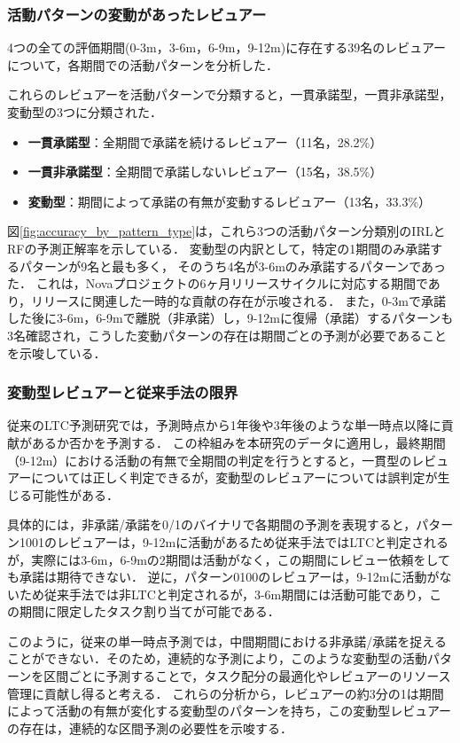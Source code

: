 \documentclass[11pt]{jreport}
\begin{document}
\subsubsection{活動パターンの変動があったレビュアー}
4つの全ての評価期間(0-3m，3-6m，6-9m，9-12m)に存在する39名のレビュアーについて，各期間での活動パターンを分析した．

これらのレビュアーを活動パターンで分類すると，一貫承諾型，一貫非承諾型，変動型の3つに分類された．
\begin{itemize}
    \item \textbf{一貫承諾型}：全期間で承諾を続けるレビュアー（11名，28.2\%）
    \item \textbf{一貫非承諾型}：全期間で承諾しないレビュアー（15名，38.5\%）
    \item \textbf{変動型}：期間によって承諾の有無が変動するレビュアー（13名，33.3\%）
\end{itemize}

図\ref{fig:accuracy_by_pattern_type}は，これら3つの活動パターン分類別のIRLとRFの予測正解率を示している．
変動型の内訳として，特定の1期間のみ承諾するパターンが9名と最も多く，
そのうち4名が3-6mのみ承諾するパターンであった．
これは，Novaプロジェクトの6ヶ月リリースサイクルに対応する期間であり，リリースに関連した一時的な貢献の存在が示唆される．
また，0-3mで承諾した後に3-6m，6-9mで離脱（非承諾）し，9-12mに復帰（承諾）するパターンも3名確認され，こうした変動パターンの存在は期間ごとの予測が必要であることを示唆している．

\subsubsection{変動型レビュアーと従来手法の限界}
従来のLTC予測研究では，予測時点から1年後や3年後のような単一時点以降に貢献があるか否かを予測する．
この枠組みを本研究のデータに適用し，最終期間（9-12m）における活動の有無で全期間の判定を行うとすると，一貫型のレビュアーについては正しく判定できるが，変動型のレビュアーについては誤判定が生じる可能性がある．

具体的には，非承諾/承諾を0/1のバイナリで各期間の予測を表現すると，パターン1001のレビュアーは，9-12mに活動があるため従来手法ではLTCと判定されるが，実際には3-6m，6-9mの2期間は活動がなく，この期間にレビュー依頼をしても承諾は期待できない．
逆に，パターン0100のレビュアーは，9-12mに活動がないため従来手法では非LTCと判定されるが，3-6m期間には活動可能であり，この期間に限定したタスク割り当てが可能である．

このように，従来の単一時点予測では，中間期間における非承諾/承諾を捉えることができない．そのため，連続的な予測により，このような変動型の活動パターンを区間ごとに予測することで，タスク配分の最適化やレビュアーのリソース管理に貢献し得ると考える．
これらの分析から，レビュアーの約3分の1は期間によって活動の有無が変化する変動型のパターンを持ち，この変動型レビュアーの存在は，連続的な区間予測の必要性を示唆する．
\end{document}
